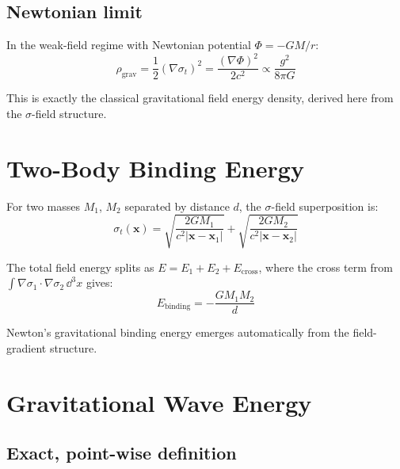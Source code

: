 \documentclass[11pt,a4paper]{article}
\theoremstyle{plain}
\theoremstyle{definition}
\theoremstyle{remark}
\begin{document}
\subsection{Newtonian limit}

In the weak-field regime with Newtonian potential $\Phi = -GM/r$:
\begin{equation}
  \rho_{\mathrm{grav}} = \frac{1}{2}(\nabla\sigma_t)^2 = \frac{(\nabla\Phi)^2}{2c^2} \propto \frac{g^2}{8\pi G}
\end{equation}

This is exactly the classical gravitational field energy density, derived here from the $\sigma$-field structure.

\section{Two-Body Binding Energy}
\label{sec:binding}

For two masses $M_1$, $M_2$ separated by distance $d$, the $\sigma$-field superposition is:
\begin{equation}
  \sigma_t(\mathbf{x}) = \sqrt{\frac{2GM_1}{c^2|\mathbf{x}-\mathbf{x}_1|}} + \sqrt{\frac{2GM_2}{c^2|\mathbf{x}-\mathbf{x}_2|}}
\end{equation}

The total field energy splits as $E = E_1 + E_2 + E_{\mathrm{cross}}$, where the cross term from $\int\nabla\sigma_1\cdot\nabla\sigma_2\,\dd^3x$ gives:
\begin{equation}
  \boxed{E_{\mathrm{binding}} = -\frac{GM_1M_2}{d}}
  \label{eq:binding}
\end{equation}

Newton's gravitational binding energy emerges automatically from the field-gradient structure.

\section{Gravitational Wave Energy}
\label{sec:gw}

\subsection{Exact, point-wise definition}
\end{document}
